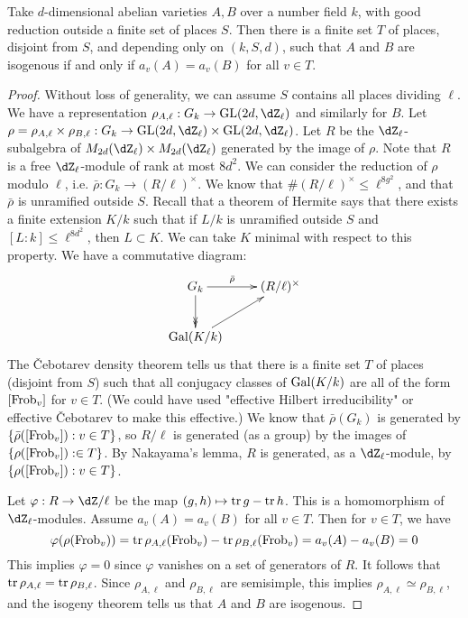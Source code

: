 \begin{lemma}[Faltings]
Take $d$-dimensional abelian varieties $A,B$ over a number field $k$, with good 
reduction outside a finite set of places $S$. Then there is a finite set $T$ of 
places, disjoint from $S$, and depending only on $(k,S,d)$, such that 
$A$ and $B$ are isogenous if and only if $a_v(A)=a_v(B)$ for all $v\in T$. 
\end{lemma}
\begin{proof}
Without loss of generality, we can assume $S$ contains all places dividing 
$\ell$. We have a representation 
$\rho_{A,\ell}:G_k \to \gl{2 d}{\dZ_\ell}$ and similarly for 
$B$. Let 
$\rho=\rho_{A,\ell}\times \rho_{B,\ell}:G_k \to \gl{2d}{\dZ_\ell}\times \gl{2d}{\dZ_\ell}$. 
Let $R$ be the $\dZ_\ell$-subalgebra of $M_{2 d}(\dZ_\ell)\times M_{2 d}(\dZ_\ell)$ 
generated by the image of $\rho$. Note that $R$ is a free $\dZ_\ell$-module of 
rank at most $8 d^2$. We can consider the reduction of $\rho$ modulo $\ell$, 
i.e. $\bar\rho:G_k \to (R/\ell)^\times$. We know that 
$\# (R/\ell)^\times \leqslant \ell^{8 g^2}$, and that $\bar\rho$ is unramified 
outside $S$. Recall that a theorem of Hermite says that there exists a finite 
extension $K/k$ such that if $L/k$ is unramified outside $S$ and 
$[L:k]\leqslant \ell^{8 d^2}$, then $L\subset K$. We can take $K$ minimal with 
respect to this property. We have a commutative diagram: 
\[\xymatrix{
  G_k \ar[r]^-{\bar\rho} \ar@{->>}[d] 
    & (R/\ell)^\times \\
  \gal(K/k) \ar[ur]
}\]
The \v Cebotarev density theorem tells us that there is a finite set $T$ of 
places (disjoint from $S$) such that all conjugacy classes of $\operatorname{Gal}(K/k)$ are 
all of the form $[\mathrm{Frob}_v]$ for $v\in T$. 
(We could have used "effective Hilbert irreducibility" or effective 
\v Cebotarev to make this effective.) 
We know that $\bar\rho(G_k)$ is generated by $\{\bar\rho([\mathrm{Frob}_v]):v\in T\}$, 
so $R/\ell$ is generated (as a group) by the images of 
$\{\rho([\mathrm{Frob}_v]):\in T\}$. By Nakayama's lemma, $R$ is generated, as a 
$\dZ_\ell$-module, by $\{\rho([\mathrm{Frob}_v]):v\in T\}$. 

Let $\varphi:R \to \dZ/\ell$ be the map $(g,h)\mapsto \operatorname{tr} g-\operatorname{tr} h$. This 
is a homomorphism of $\dZ_\ell$-modules. Assume $a_v(A)=a_v(B)$ for all 
$v\in T$. Then for $v\in T$, we have 
\[
  \varphi(\rho(\mathrm{Frob}_v)) = \operatorname{tr} \rho_{A,\ell}(\mathrm{Frob}_v) - \operatorname{tr}\rho_{B,\ell}(\mathrm{Frob}_v) = a_v(A)-a_v(B) = 0 
\]
This implies $\varphi=0$ since $\varphi$ vanishes on a set of generators of 
$R$. It follows that $\operatorname{tr} \rho_{A,\ell} = \operatorname{tr}\rho_{B,\ell}$. Since 
$\rho_{A,\ell}$ and $\rho_{B,\ell}$ are semisimple, this implies 
$\rho_{A,\ell}\simeq \rho_{B,\ell}$, and the isogeny theorem tells us that 
$A$ and $B$ are isogenous. 
\end{proof}

